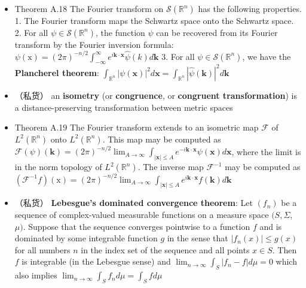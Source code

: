 \begin{itemize}
\item Theorem A.18 The Fourier transform on $\mathcal{S}\left(\mathbb{R}^{n}\right)$ has the following properties.
1. The Fourier transform maps the Schwartz space onto the Schwartz space.
2. For all $\psi \in \mathcal{S}\left(\mathbb{R}^{n}\right)$, the function $\psi$ can be recovered from its Fourier transform by the Fourier inversion formula: $\psi(\mathrm{x})=(2 \pi)^{-n / 2} \int_{-\infty}^{\infty} e^{i \mathbf{k} \cdot \mathbf{x}} \hat{\psi}(k) d \mathbf{k}$
3. For all $\psi \in \mathcal{S}\left(\mathbb{R}^{n}\right)$, we have the \textbf{Plancherel theorem}: $\int_{\mathbb{R}^{n}}|\psi(\mathbf{x})|^{2} d \mathbf{x}=\int_{\mathbb{R}^{n}}|\hat{\psi}(\mathbf{k})|^{2} d \mathbf{k}$

\item （私货） an \textbf{isometry} (or \textbf{congruence}, or \textbf{congruent transformation}) is a distance-preserving transformation between metric spaces

\item Theorem A.19 The Fourier transform extends to an isometric map $\mathcal{F}$ of $L^{2}\left(\mathbb{R}^{n}\right)$ onto $L^{2}\left(\mathbb{R}^{n}\right)$. This map may be computed as $\mathcal{F}(\psi)(\mathbf{k})=(2 \pi)^{-n / 2} \lim _{A \rightarrow \infty} \int_{|\mathbf{x}| \leq A} e^{-i \mathbf{k} \cdot \mathbf{x}} \psi(\mathbf{x}) d \mathbf{x}$, where the limit is in the norm topology of $L^{2}\left(\mathbb{R}^{n}\right)$. The inverse map $\mathcal{F}^{-1}$ may be computed as $\left(\mathcal{F}^{-1} f\right)(\mathrm{x})=(2 \pi)^{-n / 2} \lim _{A \rightarrow \infty} \int_{|\mathbf{x}| \leq A} e^{i \mathbf{k} \cdot \mathbf{x}} f(\mathbf{k}) d \mathbf{k}$

\item （私货） \textbf{Lebesgue's dominated convergence theorem}: Let $\left(f_{n}\right)$ be a sequence of complex-valued measurable functions on a measure space $(S, \Sigma$, $\mu)$. Suppose that the sequence converges pointwise to a function $f$ and is dominated by some integrable function $g$ in the sense that $\left|f_{n}(x)\right| \leq g(x)$ for all numbers $n$ in the index set of the sequence and all points $x \in S$. Then $f$ is integrable (in the Lebesgue sense) and
$\lim _{n \rightarrow \infty} \int_{S}\left|f_{n}-f\right| d \mu=0$ which also implies $\lim _{n \rightarrow \infty} \int_{S} f_{n} d \mu=\int_{S} f d \mu$
\end{itemize}

